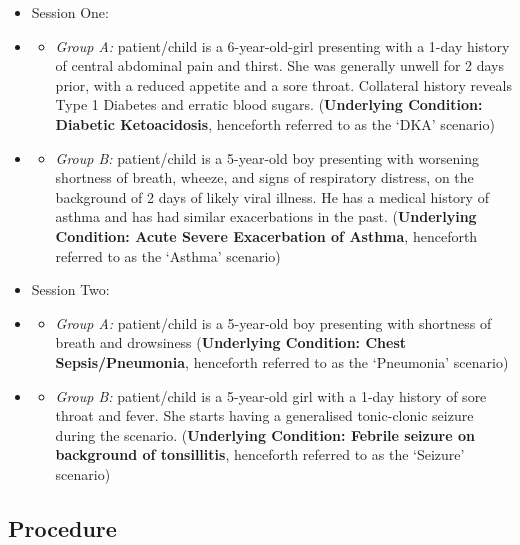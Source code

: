 \documentclass[a4paper, nobind]{templates/ociamthesis}
\providecommand{\tightlist}{%
  \setlength{\itemsep}{0pt}\setlength{\parskip}{0pt}}
\begin{document}
\begin{itemize}
\tightlist
\item
  Session One:
\item
  \begin{itemize}
  \tightlist
  \item
    \emph{Group A:} patient/child is a 6-year-old-girl presenting with a 1-day history of central abdominal pain and thirst. She was generally unwell for 2 days prior, with a reduced appetite and a sore throat. Collateral history reveals Type 1 Diabetes and erratic blood sugars. (\textbf{Underlying Condition: Diabetic Ketoacidosis}, henceforth referred to as the `DKA' scenario)
  \end{itemize}
\item
  \begin{itemize}
  \tightlist
  \item
    \emph{Group B:} patient/child is a 5-year-old boy presenting with worsening shortness of breath, wheeze, and signs of respiratory distress, on the background of 2 days of likely viral illness. He has a medical history of asthma and has had similar exacerbations in the past. (\textbf{Underlying Condition: Acute Severe Exacerbation of Asthma}, henceforth referred to as the `Asthma' scenario)
  \end{itemize}
\item
  Session Two:
\item
  \begin{itemize}
  \tightlist
  \item
    \emph{Group A:} patient/child is a 5-year-old boy presenting with shortness of breath and drowsiness (\textbf{Underlying Condition: Chest Sepsis/Pneumonia}, henceforth referred to as the `Pneumonia' scenario)
  \end{itemize}
\item
  \begin{itemize}
  \tightlist
  \item
    \emph{Group B:} patient/child is a 5-year-old girl with a 1-day history of sore throat and fever. She starts having a generalised tonic-clonic seizure during the scenario. (\textbf{Underlying Condition: Febrile seizure on background of tonsillitis}, henceforth referred to as the `Seizure' scenario)
  \end{itemize}
\end{itemize}

\subsection*{Procedure}\label{procedure-2}
\end{document}
